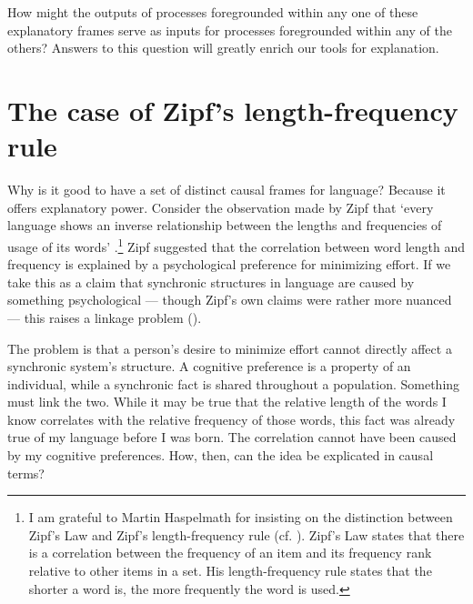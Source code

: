 How might the outputs of processes foregrounded within any one of these 
explanatory frames serve as inputs for processes foregrounded within any 
of the others? Answers to this question will greatly enrich our tools for 
explanation.



\section{The case of Zipf's length-frequency rule}
\label{zipflengthrule}
Why is it good to have a set of distinct causal frames for language?
Because it offers explanatory power. Consider the observation made by Zipf that \textquoteleft every language shows an inverse relationship between the lengths 
and frequencies of usage of its words' \citep[66]{zipf_human_1949}.\footnote{I am grateful to Martin Haspelmath for insisting on the distinction between Zipf's Law and Zipf's length-frequency rule (cf. \citealt{NewmanPowerLaws2006}). Zipf's Law states that there is a correlation between the frequency of an item and its frequency rank relative to other items in a set. His length-frequency rule states that the shorter a word is, the more frequently the word is used.} Zipf suggested that the correlation between word length and frequency is explained by a psychological preference for minimizing 
effort. If we take this as a claim that synchronic structures in 
language are caused by something psychological --- though Zipf's own claims 
were rather more nuanced --- this raises a linkage problem (\citealt[201]{clark_psychological_1984}). 



The problem is that a person's desire to minimize effort cannot directly affect a synchronic system's structure. 
A cognitive preference is a property of an individual, while a synchronic 
fact is shared throughout a population. Something must link the two. 
While it may be true that the relative length of the words I know 
correlates with the relative frequency of those words, this fact was 
already true of my language before I was born. The correlation cannot have been caused by my cognitive 
preferences. How, then, can the idea be explicated in causal terms?



